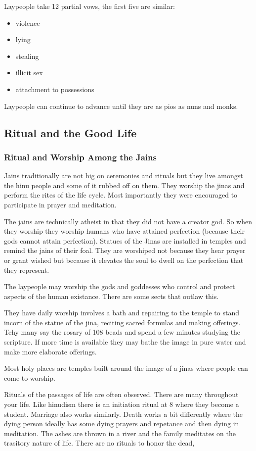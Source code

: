 \documentclass{article}
\begin{document}
Laypeople take 12 partial vows, the first five are similar:
\begin{itemize}
	\item violence
	\item lying
	\item stealing
	\item illicit sex
	\item attachment to possessions
\end{itemize}
Laypeople can continue to advance until they are as pios as nuns and monks.

\subsection*{Ritual and the Good Life}
\label{sub:ritual_and_the_good_life}
\subsubsection*{Ritual and Worship Among the Jains}
\label{ssub:ritual_and_worship_among_the_jains}
Jains traditionally are not big on ceremonies and rituals but they live amongst the hinu people and some of it rubbed off on them. They worship the jinas and perform the rites of the life cycle. Most importantly they were encouraged to participate in prayer and meditation.

The jains are technically atheist  in that they did not have a creator god. So when they worship they worship humans who have attained perfection (because their gods cannot attain perfection). Statues of the Jinas are installed in temples and remind the jains of their foal. They are worshiped not because they hear prayer or grant wished but because it elevates the soul to dwell on the perfection that they represent.

The laypeople may worship the gods and goddesses who control and protect aspects of the human existance. There are some sects that outlaw this.

They have daily worship involves a bath and repairing to the temple to stand incorn of the statue of the jina, reciting sacred formulas and making offerings. Tehy many say the rosary of 108 beads and spend a few minutes studying the scripture. If more time is available they may bathe the image in pure water and make more elaborate offerings.

Most holy places are temples built around the image of a jinas where people can come to worship.

Rituals of the passages of life are often observed. There are many throughout your life. Like hinudism there is an initiation ritual at 8 where they become a student. Marriage also works similarly. Death works a bit differently where the dying person ideally has some dying prayers and repetance and then dying in meditation. The ashes are thrown in a river and the family meditates on the trasitory nature of life. There are no rituals to honor the dead,
\end{document}
